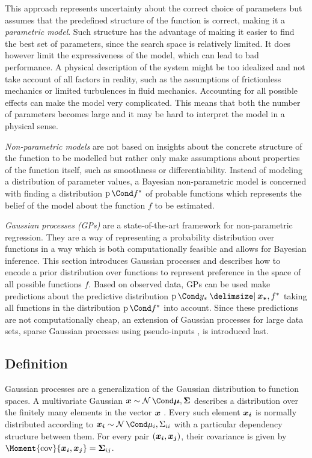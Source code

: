 This approach represents uncertainty about the correct choice of parameters but assumes that the predefined structure of the function is correct, making it a \emph{parametric model}.
Such structure has the advantage of making it easier to find the best set of parameters, since the search space is relatively limited.
It does however limit the expressiveness of the model, which can lead to bad performance.
A physical description of the system might be too idealized and not take account of all factors in reality, such as the assumptions of frictionless mechanics or limited turbulences in fluid mechanics.
Accounting for all possible effects can make the model very complicated.
This means that both the number of parameters becomes large and it may be hard to interpret the model in a physical sense.

\emph{Non-parametric models} are not based on insights about the concrete structure of the function to be modelled but rather only make assumptions about properties of the function itself, such as smoothness or differentiability.
Instead of modeling a distribution of parameter values, a Bayesian non-parametric model is concerned with finding a distribution $\Prob{f^\ast}$ of probable functions which represents the belief of the model about the function $f$ to be estimated.

\emph{Gaussian processes (GPs)} are a state-of-the-art framework for non-parametric regression.
They are a way of representing a probability distribution over functions in a way which is both computationally feasible and allows for Bayesian inference.
This section introduces Gaussian processes and describes how to encode a prior distribution over functions to represent preference in the space of all possible functions $f$.
Based on observed data, GPs can be used make predictions about the predictive distribution $\Prob{y_\ast \given \mat{x_\ast}, f^\ast}$ taking all functions in the distribution $\Prob{f^\ast}$ into account.
Since these predictions are not computationally cheap, an extension of Gaussian processes for large data sets, sparse Gaussian processes using pseudo-inputs \cite{snelson_sparse_2005}, is introduced last.

\subsection{Definition}
Gaussian processes are a generalization of the Gaussian distribution to function spaces.
A multivariate Gaussian $\mat{x} \sim \Gaussian{\mat{\mu}, \mat{\Sigma}}$ describes a distribution over the finitely many elements in the vector $\bm{x}$ \cite{gauss_theoria_1809}.
Every such element $\bm{x_i}$ is normally distributed according to $\rv{x_i} \sim \Gaussian{\mu_i, \Sigma_{ii}}$ with a particular dependency structure between them.
For every pair $(\bm{x_i}, \bm{x_j})$, their covariance is given by $\Moment{\cov}{\rv{x_i}, \rv{x_j}} = \mat{\Sigma}_{ij}$.

